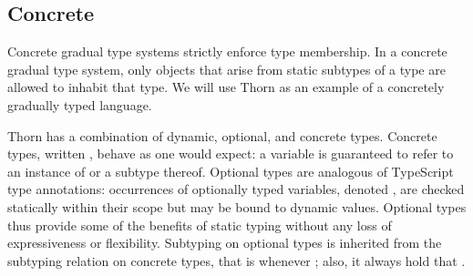 \documentclass{tex/llncs}
\begin{document}


% 
% 

\subsection{Concrete}

Concrete gradual type systems strictly enforce type membership. In a concrete
gradual type system, only objects that arise from static subtypes of a type
are allowed to inhabit that type. We will use Thorn as an example of a
concretely gradually typed language.

Thorn has a combination of dynamic, optional, and concrete types.  Concrete
types, written \C, behave as one would expect: a variable \HT\x\C is
guaranteed to refer to an instance of \C or a subtype thereof.  Optional
types are analogous of TypeScript type annotations: occurrences of
optionally typed variables, denoted \HT\x{\dt\C}, are checked statically
within their scope but may be bound to dynamic values.  Optional types thus
provide some of the benefits of static typing without any loss of
expressiveness or flexibility.  Subtyping on optional types is inherited
from the subtyping relation on concrete types, that is {\dt\C} \Sub {\dt\D}
whenever \C \Sub \D; also, it always hold that \C \Sub \dt\C.
\end{document}
